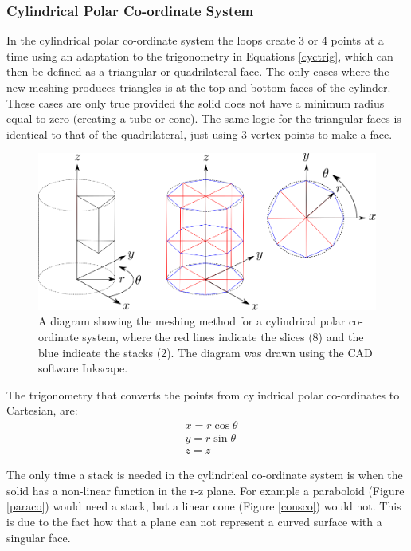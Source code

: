\documentclass[12pt,a4paper]{article}
\begin{document}
\subsubsection{Cylindrical Polar Co-ordinate System}
\label{cycl}
In the cylindrical polar co-ordinate system the loops create 3 or 4 points at a time using an adaptation to the trigonometry in Equations \ref{cyctrig}, which can then be defined as a triangular or quadrilateral face. The only cases where the new meshing produces triangles is at the top and bottom faces of the cylinder. These cases are only true provided the solid does not have a minimum radius equal to zero (creating a tube or cone). The same logic for the triangular faces is identical to that of the quadrilateral, just using 3 vertex points to make a face.

\begin{figure}[h!]
\centering
\includegraphics[scale=0.45]{Images//Coords//cyl.png}
\caption[width=\columnwidth]{A diagram showing the meshing method for a cylindrical polar co-ordinate system, where the red lines indicate the slices (8) and the blue indicate the stacks (2). The diagram was drawn using the CAD software Inkscape.}
\label{cylmeshin}
\end{figure}
The trigonometry that converts the points from cylindrical polar co-ordinates to Cartesian, are:
\begin{equation}
\begin{aligned}
\label{cyctrig}
& x = r \cos{\theta} \\
& y = r \sin{\theta} \\
& z = z
\end{aligned}
\end{equation}

\noindent The only time a stack is needed in the cylindrical co-ordinate system is when the solid has a non-linear function in the r-z plane. For example a paraboloid (Figure \ref{paraco}) would need a stack, but a linear cone (Figure \ref{consco}) would not. This is due to the fact how that a plane can not represent a curved surface with a singular face. 
\end{document}
